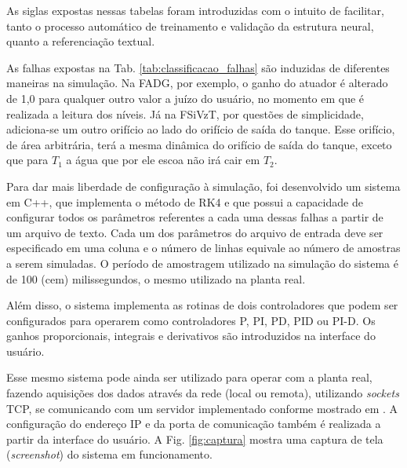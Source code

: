 
As siglas expostas nessas tabelas foram introduzidas com o intuito de facilitar,
tanto o processo automático de treinamento e validação da estrutura neural,
quanto a referenciação textual.

As falhas expostas na Tab. \ref{tab:classificacao_falhas} são induzidas de
diferentes maneiras na simulação. Na FADG, por exemplo, o ganho do atuador é
alterado de 1,0 para qualquer outro valor a juízo do usuário, no momento em que é
realizada a leitura dos níveis. Já na FSiVzT, por questões de simplicidade,
adiciona-se um outro orifício ao lado do orifício de saída do tanque. Esse
orifício, de área arbitrária, terá a mesma dinâmica do orifício de saída do
tanque, exceto que para $T_1$ a água que por ele escoa não irá cair em $T_2$.

Para dar mais liberdade de configuração à simulação, foi desenvolvido um sistema
em C++, que implementa o método de RK4 e que possui a capacidade de configurar
todos os parâmetros referentes a cada uma dessas falhas a partir de um arquivo
de texto. Cada um dos parâmetros do arquivo de entrada deve ser especificado em
uma coluna e o número de linhas equivale ao número de amostras a serem
simuladas. O período de amostragem utilizado na simulação do sistema é de 100
(cem) milissegundos, o mesmo utilizado na planta real.

Além disso, o sistema implementa as rotinas de dois controladores que podem ser
configurados para operarem como controladores P, PI, PD, PID ou PI-D. Os ganhos
proporcionais, integrais e derivativos são introduzidos na interface do usuário.

Esse mesmo sistema pode ainda ser utilizado para operar com a planta real,
fazendo aquisições dos dados através da rede (local ou remota), utilizando {\it
sockets} TCP, se comunicando com um servidor implementado conforme mostrado em
. A configuração do endereço IP e da porta de
comunicação também é realizada a partir da interface do usuário. A Fig.
\ref{fig:captura} mostra uma captura de tela ({\it screenshot}) do sistema em
funcionamento.

